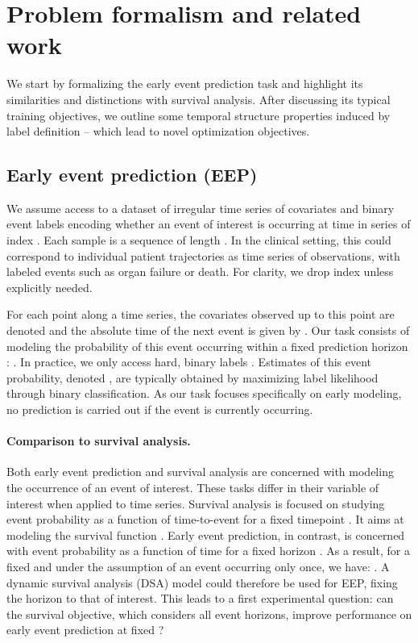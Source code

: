 \documentclass[nohyperref]{article}
\begin{document}
\section{Problem formalism and related work}\label{sec:pf_relatedwork}


We start by formalizing the early event prediction task and highlight its similarities and distinctions with survival analysis. After discussing its typical training objectives, we outline some temporal structure properties induced by label definition -- which lead to novel optimization objectives.


\subsection{Early event prediction (EEP)}\label{sec:problem_formalism}

We assume access to a dataset of irregular time series of covariates  and binary event labels  encoding whether an event of interest is occurring at time  in series of index . Each sample is a sequence  of length . In the clinical setting, this could correspond to individual patient trajectories as time series of observations, with labeled events such as organ failure or death. For clarity, we drop index  unless explicitly needed.

For each point  along a time series, the covariates observed up to this point are denoted  and the absolute time of the next event is given by . Our task consists of modeling the probability of this event occurring within a fixed prediction horizon : . In practice, we only access hard, binary labels . Estimates of this event probability, denoted , are typically obtained by maximizing label likelihood through binary classification. As our task focuses specifically on early modeling, no prediction is carried out if the event is currently occurring. 



\paragraph{Comparison to survival analysis.} Both early event prediction and survival analysis are concerned with modeling the occurrence of an event of interest. These tasks differ in their variable of interest when applied to time series. Survival analysis is focused on studying event probability as a function of time-to-event  for a fixed timepoint . It aims at modeling the survival function . Early event prediction, in contrast, is concerned with event probability as a function of time  for a fixed horizon . As a result, for a fixed  and under the assumption of an event occurring only once, we have: . A dynamic survival analysis (DSA) model could therefore be used for EEP, fixing the horizon to that of interest.  This leads to a first experimental question: can the survival objective, which considers all event horizons, improve performance on early event prediction at fixed ?
\end{document}
